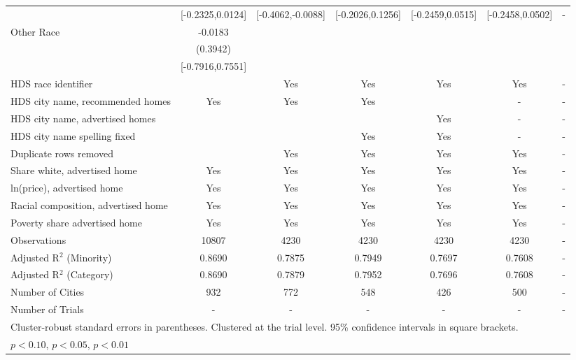 \begin{table}[htbp]
{\begin{tabular}{l*{6}{c}}
 & [-0.2325,0.0124] & [-0.4062,-0.0088] & [-0.2026,0.1256] & [-0.2459,0.0515] & [-0.2458,0.0502] & - \\
Other Race & -0.0183 &  &  &  &  &  \\
 & (0.3942) &  &  &  &  &  \\
 & [-0.7916,0.7551] &  &  &  &  &  \\
\midrule
HDS race identifier & & Yes & Yes & Yes & Yes & - \\
HDS city name, recommended homes & Yes & Yes & Yes & & - & -\\
HDS city name, advertised homes &  &  &  & Yes & - & -\\
HDS city name spelling fixed & & & Yes & Yes & - & -\\
Duplicate rows removed &  & Yes & Yes & Yes & Yes & - \\
\midrule
Share white, advertised home  & Yes & Yes & Yes & Yes & Yes & - \\
ln(price), advertised home  & Yes & Yes & Yes & Yes & Yes & - \\
Racial composition, advertised home & Yes & Yes & Yes & Yes & Yes & - \\
Poverty share advertised home & Yes & Yes & Yes & Yes & Yes & - \\
Observations & 10807 & 4230 & 4230 & 4230 & 4230 & - \\
Adjusted R$^2$ (Minority) & 0.8690 & 0.7875 & 0.7949 & 0.7697 & 0.7608 & - \\
Adjusted R$^2$ (Category) & 0.8690 & 0.7879 & 0.7952 & 0.7696 & 0.7608 & - \\
Number of Cities & 932 & 772 & 548 & 426 & 500 & - \\
Number of Trials & - & - & - & - & - & - \\
\bottomrule
\multicolumn{7}{l}{\footnotesize Cluster-robust standard errors in parentheses. Clustered at the trial level. 95\% confidence intervals in square brackets.}\\
\multicolumn{7}{l}{\footnotesize \sym{*} \(p<0.10\), \sym{**} \(p<0.05\), \sym{***} \(p<0.01\)}\\
\end{tabular}
}
\end{table}

